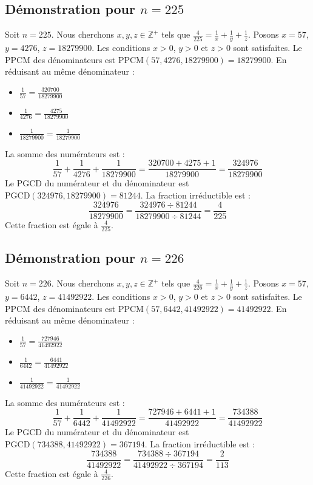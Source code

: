 \documentclass[11pt,a4paper]{article}
\begin{document}
\subsection{Démonstration pour $n = 225$}
Soit $n = 225$. Nous cherchons $x, y, z \in \mathbb{Z}^{+}$ tels que $\frac{4}{225} = \frac{1}{x} + \frac{1}{y} + \frac{1}{z}$.
Posons $x = 57$, $y = 4276$, $z = 18279900$.
Les conditions $x > 0$, $y > 0$ et $z > 0$ sont satisfaites.
Le PPCM des dénominateurs est $\text{PPCM}(57, 4276, 18279900) = 18279900$.
En réduisant au même dénominateur :
\begin{itemize}
    \item $\frac{1}{57} = \frac{320700}{18279900}$
    \item $\frac{1}{4276} = \frac{4275}{18279900}$
    \item $\frac{1}{18279900} = \frac{1}{18279900}$
\end{itemize}
La somme des numérateurs est :
$$ \frac{1}{57} + \frac{1}{4276} + \frac{1}{18279900} = \frac{320700 + 4275 + 1}{18279900} = \frac{324976}{18279900} $$
Le PGCD du numérateur et du dénominateur est $\text{PGCD}(324976, 18279900) = 81244$.
La fraction irréductible est :
$$ \frac{324976}{18279900} = \frac{324976 \div 81244}{18279900 \div 81244} = \frac{4}{225} $$
Cette fraction est égale à $\frac{4}{225}$.

\subsection{Démonstration pour $n = 226$}
Soit $n = 226$. Nous cherchons $x, y, z \in \mathbb{Z}^{+}$ tels que $\frac{4}{226} = \frac{1}{x} + \frac{1}{y} + \frac{1}{z}$.
Posons $x = 57$, $y = 6442$, $z = 41492922$.
Les conditions $x > 0$, $y > 0$ et $z > 0$ sont satisfaites.
Le PPCM des dénominateurs est $\text{PPCM}(57, 6442, 41492922) = 41492922$.
En réduisant au même dénominateur :
\begin{itemize}
    \item $\frac{1}{57} = \frac{727946}{41492922}$
    \item $\frac{1}{6442} = \frac{6441}{41492922}$
    \item $\frac{1}{41492922} = \frac{1}{41492922}$
\end{itemize}
La somme des numérateurs est :
$$ \frac{1}{57} + \frac{1}{6442} + \frac{1}{41492922} = \frac{727946 + 6441 + 1}{41492922} = \frac{734388}{41492922} $$
Le PGCD du numérateur et du dénominateur est $\text{PGCD}(734388, 41492922) = 367194$.
La fraction irréductible est :
$$ \frac{734388}{41492922} = \frac{734388 \div 367194}{41492922 \div 367194} = \frac{2}{113} $$
Cette fraction est égale à $\frac{4}{226}$.
\end{document}
